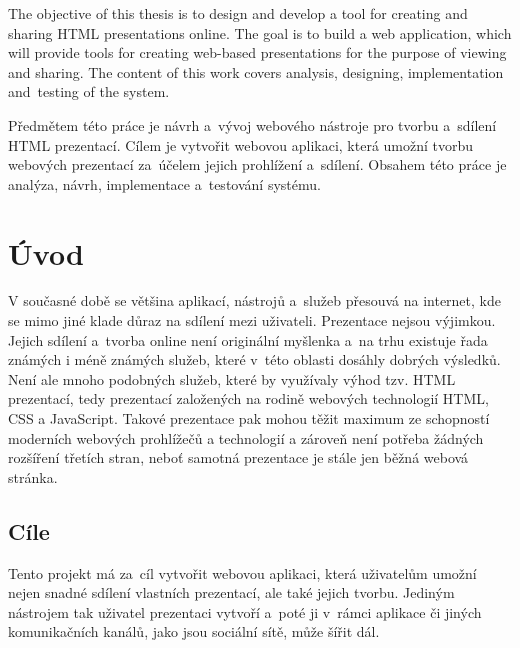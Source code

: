 \documentclass[11pt,twoside,a4paper]{book}
\begin{document}
	\abstractpage

	The objective of this thesis is to design and develop a tool for creating and sharing HTML presentations online. The goal is to build a web application, which will provide tools for creating web-based presentations for the purpose of viewing and sharing. The content of this work covers analysis, designing, implementation and~testing of the system.


	\baselineskip

	\noindent
	Předmětem této práce je návrh a~vývoj webového nástroje pro tvorbu a~sdílení HTML prezentací. Cílem je vytvořit webovou aplikaci, která umožní tvorbu webových prezentací za~účelem jejich prohlížení a~sdílení. Obsahem této práce je analýza, návrh, imple\-mentace a~testování systému.

	\tableofcontents		%

	\listoffigures			%

	\mainbodystarts



\chapter{Úvod}
V současné době se většina aplikací, nástrojů a~služeb přesouvá na internet, kde se mimo jiné klade důraz na sdílení mezi uživateli. Prezentace nejsou výjimkou. Jejich sdílení a~tvorba online není originální myšlenka a~na trhu existuje řada známých i méně známých služeb, které v~této oblasti dosáhly dobrých výsledků. Není ale mnoho podobných služeb, které by využívaly výhod tzv. HTML prezentací, tedy prezentací založených na rodině webových technologií HTML, CSS a JavaScript. Takové prezentace pak mohou těžit maximum ze schopností moderních webových prohlížečů a technologií a zároveň není potřeba žádných rozšíření třetích stran, neboť samotná prezentace je stále jen běžná webová stránka.

\section{Cíle}
Tento projekt má za~cíl vytvořit webovou aplikaci, která uživatelům umožní nejen snadné sdílení vlastních prezentací, ale také jejich tvorbu. Jediným nástrojem tak uživatel prezentaci vytvoří a~poté ji v~rámci aplikace či jiných komunikačních kanálů, jako jsou sociální sítě, může šířit dál.
\end{document}
